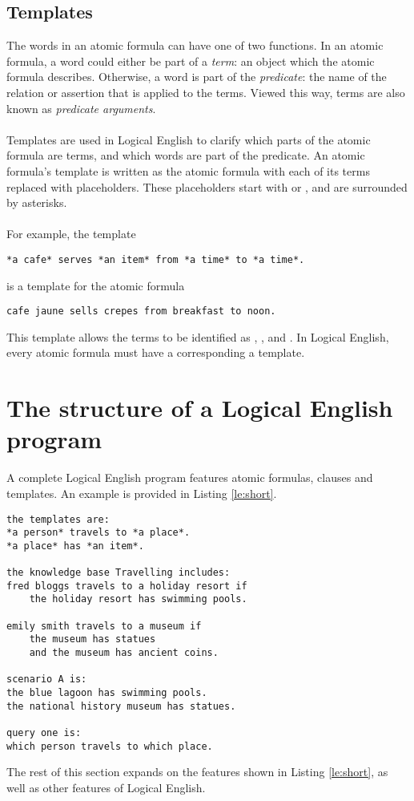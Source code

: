 \documentclass[../main.tex]{subfiles}
\begin{document}
\subsection{Templates}
The words in an atomic formula can have one of two functions. In an atomic formula, a word could either be part of a \textit{term}: an object which the atomic formula describes. Otherwise, a word is part of the \textit{predicate}: the name of the relation or assertion that is applied to the terms. Viewed this way, terms are also known as \textit{predicate arguments}.
\\
\\
Templates are used in Logical English to clarify which parts of the atomic formula are terms, and which words are part of the predicate. An atomic formula's template is written as the atomic formula with each of its terms replaced with placeholders. These placeholders start with  or , and are surrounded by asterisks. 
\\
\\
For example, the template
\begin{lstlisting}[language={LE},caption={A template in Logical English},label={le:template}]
    *a cafe* serves *an item* from *a time* to *a time*.
\end{lstlisting}
is a template for the atomic formula
\begin{lstlisting}[language={LE}]
    cafe jaune sells crepes from breakfast to noon.
\end{lstlisting}
This template allows the terms to be identified as , ,  and . In Logical English, every atomic formula must have a corresponding a template.

\section{The structure of a Logical English program}
A complete Logical English program features atomic formulas, clauses and templates. An example is provided in Listing \ref{le:short}.
\newpage
\begin{lstlisting}[language={LE},caption={A short Logical English program.},label={le:short}]
the templates are:
*a person* travels to *a place*.
*a place* has *an item*.

the knowledge base Travelling includes:
fred bloggs travels to a holiday resort if 
    the holiday resort has swimming pools.

emily smith travels to a museum if
    the museum has statues 
    and the museum has ancient coins.

scenario A is:
the blue lagoon has swimming pools.
the national history museum has statues.

query one is:
which person travels to which place.
\end{lstlisting}
The rest of this section expands on the features shown in Listing \ref{le:short}, as well as other features of Logical English.
\end{document}
